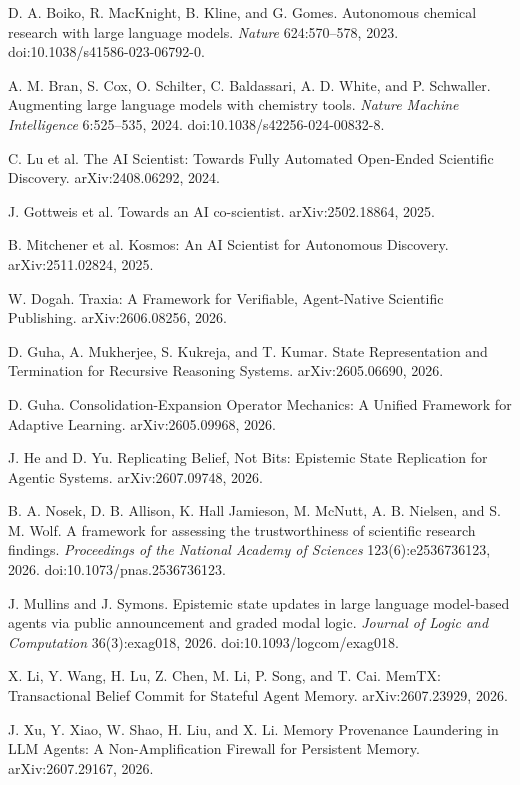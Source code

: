  D. A. Boiko, R. MacKnight, B. Kline, and G. Gomes. Autonomous chemical research with large language models. \emph{Nature} 624:570--578, 2023. doi:10.1038/s41586-023-06792-0.

 A. M. Bran, S. Cox, O. Schilter, C. Baldassari, A. D. White, and P. Schwaller. Augmenting large language models with chemistry tools. \emph{Nature Machine Intelligence} 6:525--535, 2024. doi:10.1038/s42256-024-00832-8.

 C. Lu et al. The AI Scientist: Towards Fully Automated Open-Ended Scientific Discovery. arXiv:2408.06292, 2024.

 J. Gottweis et al. Towards an AI co-scientist. arXiv:2502.18864, 2025.

 B. Mitchener et al. Kosmos: An AI Scientist for Autonomous Discovery. arXiv:2511.02824, 2025.

 W. Dogah. Traxia: A Framework for Verifiable, Agent-Native Scientific Publishing. arXiv:2606.08256, 2026.

 D. Guha, A. Mukherjee, S. Kukreja, and T. Kumar. State Representation and Termination for Recursive Reasoning Systems. arXiv:2605.06690, 2026.

 D. Guha. Consolidation-Expansion Operator Mechanics: A Unified Framework for Adaptive Learning. arXiv:2605.09968, 2026.

 J. He and D. Yu. Replicating Belief, Not Bits: Epistemic State Replication for Agentic Systems. arXiv:2607.09748, 2026.

 B. A. Nosek, D. B. Allison, K. Hall Jamieson, M. McNutt, A. B. Nielsen, and S. M. Wolf. A framework for assessing the trustworthiness of scientific research findings. \emph{Proceedings of the National Academy of Sciences} 123(6):e2536736123, 2026. doi:10.1073/pnas.2536736123.

 J. Mullins and J. Symons. Epistemic state updates in large language model-based agents via public announcement and graded modal logic. \emph{Journal of Logic and Computation} 36(3):exag018, 2026. doi:10.1093/logcom/exag018.

 X. Li, Y. Wang, H. Lu, Z. Chen, M. Li, P. Song, and T. Cai. MemTX: Transactional Belief Commit for Stateful Agent Memory. arXiv:2607.23929, 2026.

 J. Xu, Y. Xiao, W. Shao, H. Liu, and X. Li. Memory Provenance Laundering in LLM Agents: A Non-Amplification Firewall for Persistent Memory. arXiv:2607.29167, 2026.

